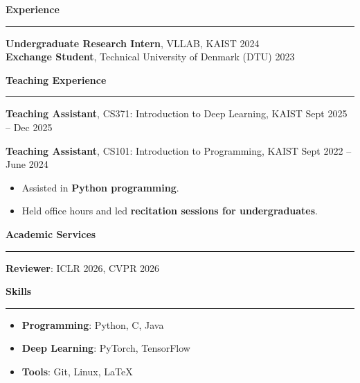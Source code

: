 \documentclass[a4paper,10pt]{article}
\newcommand{\cvsection}[1]{
  \vspace{0.35cm}
  {\normalsize \bfseries #1}\\[-0.35cm]
  \rule{\linewidth}{0.4pt}
  \vspace{0.05cm}
}
\begin{document}
\cvsection{Experience}

\textbf{Undergraduate Research Intern}, VLLAB, KAIST \hfill 2024\\
\textbf{Exchange Student}, Technical University of Denmark (DTU) \hfill 2023

\cvsection{Teaching Experience}

\textbf{Teaching Assistant}, CS371: Introduction to Deep Learning, KAIST \hfill Sept 2025 -- Dec 2025

\vspace{0.1cm}

\textbf{Teaching Assistant}, CS101: Introduction to Programming, KAIST \hfill Sept 2022 -- June 2024
\begin{itemize}[leftmargin=0.5cm, itemsep=2pt, topsep=2pt]
  \item Assisted in \textbf{Python programming}.
  \item Held office hours and led \textbf{recitation sessions for undergraduates}.
\end{itemize}

\cvsection{Academic Services}

\textbf{Reviewer}: ICLR 2026, CVPR 2026

\cvsection{Skills}

\begin{itemize}[leftmargin=0.5cm, itemsep=2pt, topsep=1pt]
  \item \textbf{Programming}: Python, C, Java
  \item \textbf{Deep Learning}: PyTorch, TensorFlow
  \item \textbf{Tools}: Git, Linux, \LaTeX
\end{itemize}
\end{document}
